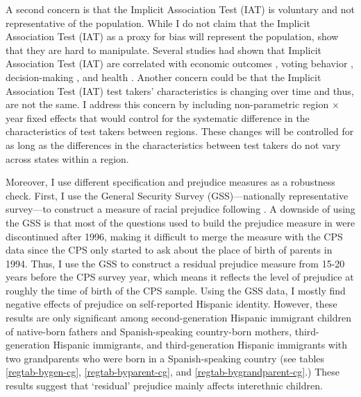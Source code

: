 \documentclass[12pt, fullpage]{article}
\begin{document}


A second concern is that the Implicit Association Test (IAT) is voluntary and not representative of the population. While I do not claim that the Implicit Association Test (IAT) as a proxy for bias will represent the population, \citet{egloffPredictiveValidityImplicit2002} show that they are hard to manipulate. Several studies had shown that Implicit Association Test (IAT) are correlated with economic outcomes \citep{chettyRaceEconomicOpportunity2020,gloverDiscriminationSelfFulfillingProphecy2017}, voting behavior \citep{friesePredictingVotingBehavior2007}, decision-making \citep{bertrandImplicitDiscrimination2005,carlanaImplicitStereotypesEvidence2019}, and health \citep{leitnerRacialBiasAssociated2016}. Another concern could be that the Implicit Association Test (IAT) test takers' characteristics is changing over time and thus, are not the same. I address this concern by including non-parametric region $\times$ year fixed effects that would control for the systematic difference in the characteristics of test takers between regions. These changes will be controlled for as long as the differences in the characteristics between test takers do not vary across states within a region. 

Moreover, I use different specification and prejudice measures as a robustness check. First, I use the General Security Survey (GSS)---nationally representative survey---to construct a measure of racial prejudice following \citet{charlesPrejudiceWagesEmpirical2008}. A downside of using the GSS is that most of the questions used to build the prejudice measure in \citet{charlesPrejudiceWagesEmpirical2008} were discontinued after 1996, making it difficult to merge the measure with the CPS data since the CPS only started to ask about the place of birth of parents in 1994. Thus, I use the GSS to construct a residual prejudice measure from 15-20 years before the CPS survey year, which means it reflects the level of prejudice at roughly the time of birth of the CPS sample. Using the GSS data, I mostly find negative effects of prejudice on self-reported Hispanic identity. However, these results are only significant among second-generation Hispanic immigrant children of native-born fathers and Spanish-speaking country-born mothers, third-generation Hispanic immigrants, and third-generation Hispanic immigrants with two grandparents who were born in a Spanish-speaking country (see tables \ref{regtab-bygen-cg}, \ref{regtab-byparent-cg}, and \ref{regtab-bygrandparent-cg}.) These results suggest that `residual' prejudice mainly affects interethnic children. 
\end{document}
